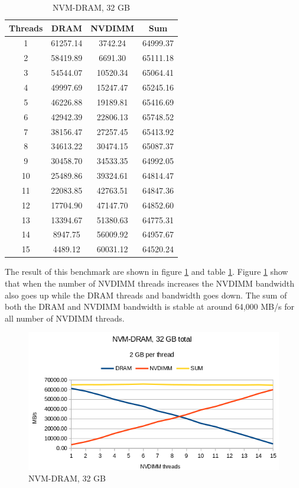 \documentclass[12pt,a4paper,USenglish]{article}      %
\begin{document}
\begin{table}[!hbtp]
\begin{tabular}{ |c|c|c|c| } 
\hline
Threads & DRAM & NVDIMM & Sum \\
\hline
1 & 61257.14 & 3742.24 & 64999.37 \\
\hline
2 & 58419.89 & 6691.30 & 65111.18 \\
\hline
3 & 54544.07 & 10520.34 & 65064.41 \\
\hline
4 & 49997.69 & 15247.47 & 65245.16 \\
\hline
5 & 46226.88 & 19189.81 & 65416.69 \\
\hline
6 & 42942.39 & 22806.13 & 65748.52 \\
\hline
7 & 38156.47 & 27257.45 & 65413.92 \\
\hline
8 & 34613.22 & 30474.15 & 65087.37 \\
\hline
9 & 30458.70 & 34533.35 & 64992.05 \\
\hline
10 & 25489.86 & 39324.61 & 64814.47 \\
\hline
11 & 22083.85 & 42763.51 & 64847.36 \\
\hline
12 & 17704.90 & 47147.70 & 64852.60 \\
\hline
13 & 13394.67 & 51380.63 & 64775.31 \\
\hline
14 & 8947.75 & 56009.92 & 64957.67 \\
\hline
15 & 4489.12 & 60031.12 & 64520.24 \\
\hline
\end{tabular}
\caption{NVM-DRAM, 32 GB}
\label{tab:NVM_DRAM}
\end{table}

The result of this benchmark are shown in figure \ref{fig:NVM_DRAM} and table \ref{tab:NVM_DRAM}. Figure \ref{fig:NVM_DRAM} show that when the number of NVDIMM threads increases the NVDIMM bandwidth also goes up while the DRAM threads and bandwidth goes down. The sum of both the DRAM and NVDIMM bandwidth is stable at around 64,000 MB/s for all number of NVDIMM threads. 

\begin{figure}[!hbtp]
\includegraphics[scale=0.7]{Benchmarks/NVM-DRAM_32GB_Figure.png}
\caption{NVM-DRAM, 32 GB}
\label{fig:NVM_DRAM}
\end{figure}
\end{document}
